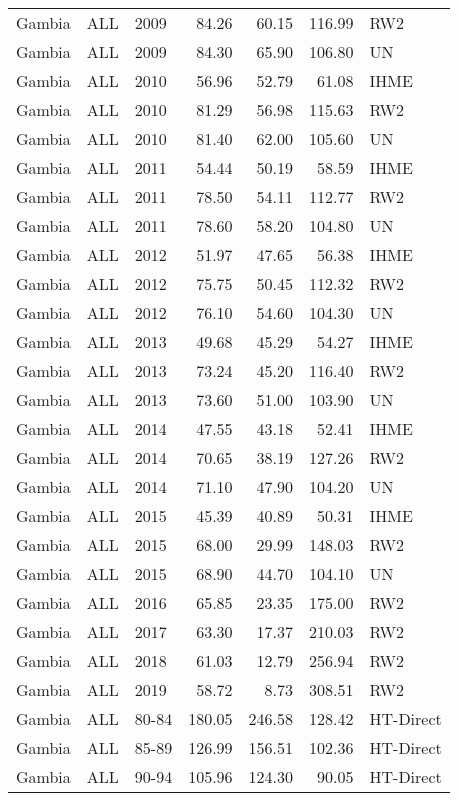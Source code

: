 \begin{longtable}{lllrrrl}
  Gambia & ALL & 2009 & 84.26 & 60.15 & 116.99 & RW2 \\ 
  Gambia & ALL & 2009 & 84.30 & 65.90 & 106.80 & UN \\ 
  Gambia & ALL & 2010 & 56.96 & 52.79 & 61.08 & IHME \\ 
  Gambia & ALL & 2010 & 81.29 & 56.98 & 115.63 & RW2 \\ 
  Gambia & ALL & 2010 & 81.40 & 62.00 & 105.60 & UN \\ 
  Gambia & ALL & 2011 & 54.44 & 50.19 & 58.59 & IHME \\ 
  Gambia & ALL & 2011 & 78.50 & 54.11 & 112.77 & RW2 \\ 
  Gambia & ALL & 2011 & 78.60 & 58.20 & 104.80 & UN \\ 
  Gambia & ALL & 2012 & 51.97 & 47.65 & 56.38 & IHME \\ 
  Gambia & ALL & 2012 & 75.75 & 50.45 & 112.32 & RW2 \\ 
  Gambia & ALL & 2012 & 76.10 & 54.60 & 104.30 & UN \\ 
  Gambia & ALL & 2013 & 49.68 & 45.29 & 54.27 & IHME \\ 
  Gambia & ALL & 2013 & 73.24 & 45.20 & 116.40 & RW2 \\ 
  Gambia & ALL & 2013 & 73.60 & 51.00 & 103.90 & UN \\ 
  Gambia & ALL & 2014 & 47.55 & 43.18 & 52.41 & IHME \\ 
  Gambia & ALL & 2014 & 70.65 & 38.19 & 127.26 & RW2 \\ 
  Gambia & ALL & 2014 & 71.10 & 47.90 & 104.20 & UN \\ 
  Gambia & ALL & 2015 & 45.39 & 40.89 & 50.31 & IHME \\ 
  Gambia & ALL & 2015 & 68.00 & 29.99 & 148.03 & RW2 \\ 
  Gambia & ALL & 2015 & 68.90 & 44.70 & 104.10 & UN \\ 
  Gambia & ALL & 2016 & 65.85 & 23.35 & 175.00 & RW2 \\ 
  Gambia & ALL & 2017 & 63.30 & 17.37 & 210.03 & RW2 \\ 
  Gambia & ALL & 2018 & 61.03 & 12.79 & 256.94 & RW2 \\ 
  Gambia & ALL & 2019 & 58.72 & 8.73 & 308.51 & RW2 \\ 
  Gambia & ALL & 80-84 & 180.05 & 246.58 & 128.42 & HT-Direct \\ 
  Gambia & ALL & 85-89 & 126.99 & 156.51 & 102.36 & HT-Direct \\ 
  Gambia & ALL & 90-94 & 105.96 & 124.30 & 90.05 & HT-Direct \\ 

\end{longtable}
